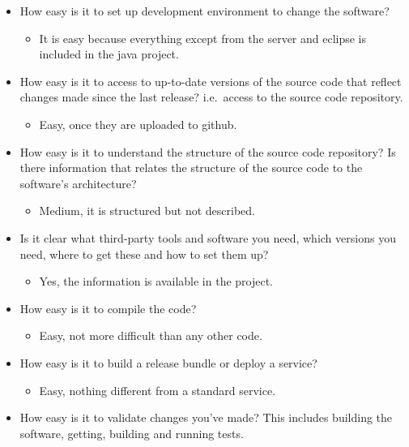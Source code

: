 \begin{itemize}
\itemsep1pt\parskip0pt
\item
  How easy is it to set up development environment to change the
  software?

  \begin{itemize}
  \itemsep1pt\parskip0pt
  \item
    It is easy because everything except from the server and eclipse is
    included in the java project.
  \end{itemize}
\item
  How easy is it to access to up-to-date versions of the source code
  that reflect changes made since the last release? i.e.~access to the
  source code repository.

  \begin{itemize}
  \itemsep1pt\parskip0pt
  \item
    Easy, once they are uploaded to github.
  \end{itemize}
\item
  How easy is it to understand the structure of the source code
  repository? Is there information that relates the structure of the
  source code to the software's architecture?

  \begin{itemize}
  \itemsep1pt\parskip0pt
  \item
    Medium, it is structured but not described.
  \end{itemize}
\item
  Is it clear what third-party tools and software you need, which
  versions you need, where to get these and how to set them up?

  \begin{itemize}
  \itemsep1pt\parskip0pt
  \item
    Yes, the information is available in the project.
  \end{itemize}
\item
  How easy is it to compile the code?

  \begin{itemize}
  \itemsep1pt\parskip0pt
  \item
    Easy, not more difficult than any other code.
  \end{itemize}
\item
  How easy is it to build a release bundle or deploy a service?

  \begin{itemize}
  \itemsep1pt\parskip0pt
  \item
    Easy, nothing different from a standard service.
  \end{itemize}
\item
  How easy is it to validate changes you've made? This includes building
  the software, getting, building and running tests.


\end{itemize}
